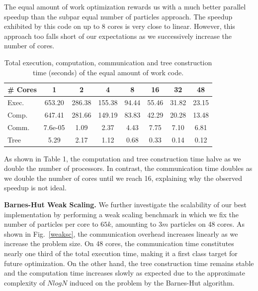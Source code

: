 \documentclass[letterpaper]{article}
\newcommand{\mypar}[1]{{\bf #1.}}
\begin{document}
The equal amount of work optimization rewards us with a much better parallel speedup than the subpar equal number of particles approach. The speedup exhibited by this code on up to 8 cores is very close to linear. However, this approach too falls short of our expectations as we successively increase the number of cores.

\begin{table}[h]
\scriptsize
\begin{tabular}{|l|c|c|c|c|c|c|c|}
\hline
\# Cores          & 1       & 2      & 4      & 8     & 16    & 32    & 48    \\ \hline
Exec.         & 653.20  & 286.38 & 155.38 & 94.44 & 55.46 & 31.82 & 23.15 \\ \hline
Comp.      & 647.41  & 281.66 & 149.19 & 83.83 & 42.29 & 20.28 & 13.48 \\ \hline
Comm.    & 7.6e-05 & 1.09   & 2.37   & 4.43  & 7.75  & 7.10  & 6.81  \\ \hline
Tree & 5.29    & 2.17   & 1.12   & 0.68  & 0.33  & 0.14  & 0.12  \\ \hline
\end{tabular}
\caption{Total execution, computation, communication and tree construction time (seconds) of the equal amount of work code.}
\vspace{-5pt}
\label{tab::strong}
\end{table}

As shown in Table 1, the computation and tree construction time halve as we double the number of processors. In contrast, the communication time doubles as we double the number of cores until we reach 16, explaining why the observed speedup is not ideal.

\mypar{Barnes-Hut Weak Scaling}
We further investigate the scalability of our best implementation by performing a weak scaling benchmark in which we fix the number of particles per core to $65k$, amounting to $3m$ particles on 48 cores. As shown in Fig.~\ref{weaksc}, the communication overhead increases linearly as we increase the problem size. On 48 cores, the communication time constitutes nearly one third of the total execution time, making it a first class target for future optimization. On the other hand, the tree construction time remains stable and the computation time increases slowly as expected due to the approximate complexity of $NlogN$ induced on the problem by the Barnes-Hut algorithm.
\end{document}
